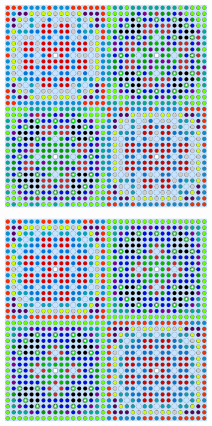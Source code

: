\begin{figure}[h!]
\begin{subfigure}{0.47\textwidth}
  \caption{}
  \label{fig:chap10-assm-2x2-combined-4}
\end{subfigure}
\begin{subfigure}{0.47\textwidth}
  \centering
  \includegraphics[width=0.9\linewidth]{figures/unsupervised/geometries/with-features/8-clusters/pinch/2x2}
  \caption{}
  \label{fig:chap10-assm-2x2-pinch-8}
\end{subfigure}%
\begin{subfigure}{0.47\textwidth}
  \centering
  \includegraphics[width=0.9\linewidth]{figures/unsupervised/geometries/with-features/8-clusters/combined/2x2}

\end{subfigure}
\end{figure}
